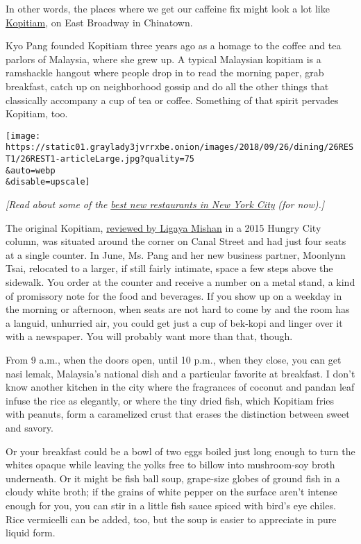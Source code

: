 In other words, the places where we get our caffeine fix might look a
lot like \href{https://www.kopitiamnyc.com/}{Kopitiam}, on East Broadway
in Chinatown.

Kyo Pang founded Kopitiam three years ago as a homage to the coffee and
tea parlors of Malaysia, where she grew up. A typical Malaysian kopitiam
is a ramshackle hangout where people drop in to read the morning paper,
grab breakfast, catch up on neighborhood gossip and do all the other
things that classically accompany a cup of tea or coffee. Something of
that spirit pervades Kopitiam, too.

\texttt{[image: https://static01.graylady3jvrrxbe.onion/images/2018/09/26/dining/26REST1/26REST1-articleLarge.jpg?quality=75\\\&auto=webp\\\&disable=upscale]}

\emph{{[}Read about some of the}
\href{https://www.nytimes3xbfgragh.onion/2018/11/15/nyregion/best-new-nyc-restaurants.html?action=click\&module=Intentional\&pgtype=Article}{\emph{best
new restaurants in New York City}} \emph{(for now).{]}}

The original Kopitiam,
\href{https://www.nytimes3xbfgragh.onion/2015/12/09/dining/hungry-city-kopitiam-lower-east-side.html}{reviewed
by Ligaya Mishan} in a 2015 Hungry City column, was situated around the
corner on Canal Street and had just four seats at a single counter. In
June, Ms. Pang and her new business partner, Moonlynn Tsai, relocated to
a larger, if still fairly intimate, space a few steps above the
sidewalk. You order at the counter and receive a number on a metal
stand, a kind of promissory note for the food and beverages. If you show
up on a weekday in the morning or afternoon, when seats are not hard to
come by and the room has a languid, unhurried air, you could get just a
cup of bek-kopi and linger over it with a newspaper. You will probably
want more than that, though.

From 9 a.m., when the doors open, until 10 p.m., when they close, you
can get nasi lemak, Malaysia's national dish and a particular favorite
at breakfast. I don't know another kitchen in the city where the
fragrances of coconut and pandan leaf infuse the rice as elegantly, or
where the tiny dried fish, which Kopitiam fries with peanuts, form a
caramelized crust that erases the distinction between sweet and savory.

Or your breakfast could be a bowl of two eggs boiled just long enough to
turn the whites opaque while leaving the yolks free to billow into
mushroom-soy broth underneath. Or it might be fish ball soup, grape-size
globes of ground fish in a cloudy white broth; if the grains of white
pepper on the surface aren't intense enough for you, you can stir in a
little fish sauce spiced with bird's eye chiles. Rice vermicelli can be
added, too, but the soup is easier to appreciate in pure liquid form.

